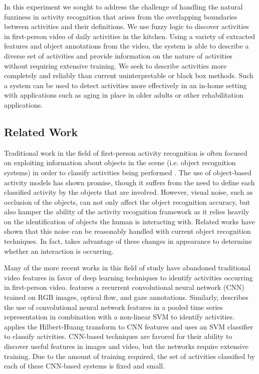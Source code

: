 \documentclass[12pt]{report}
\begin{document}
In this experiment we sought to address the challenge of handling the natural fuzziness in activity recognition that arises from the overlapping boundaries between activities and their definitions. We use fuzzy logic to discover activities in first-person video of daily activities in the kitchen. Using a variety of extracted features and object annotations from the video, the system is able to describe a diverse set of activities and provide information on the nature of activities without requiring extensive training. We seek to describe activities more completely and reliably than current uninterpretable or black box methods. Such a system can be used to detect activities more effectively in an in-home setting with applications such as aging in place in older adults or other rehabilitation applications.

\subsection{Related Work}
Traditional work in the field of first-person activity recognition is often focused on exploiting information about objects in the scene (i.e. object recognition systems) in order to classify activities being performed \cite{Nakatani2019, McCandless2013, Pirsiavash2012, Sudhakaran2018, Wang2018}. The use of object-based activity models has shown promise, though it suffers from the need to define each classified activity by the objects that are involved. However, visual noise, such as occlusion of the objects, can not only affect the object recognition accuracy, but also hamper the ability of the activity recognition framework as it relies heavily on the identification of objects the human is interacting with. Related works have shown that this noise can be reasonably handled with current object recognition techniques. In fact, \cite{Pirsiavash2012} takes advantage of these changes in appearance to determine whether an interaction is occurring.

Many of the more recent works in this field of study have abandoned traditional video features in favor of deep learning techniques to identify activities occurring in first-person video.   \cite{Li} features a recurrent convolutional neural network (CNN) trained on RGB images, optical flow, and gaze annotations. Similarly, \cite{Ryoo2015} describes the use of convolutional neural network features in a pooled time series representation in combination with a non-linear SVM to identify activities. \cite{Purwanto2017} applies the Hilbert-Huang transform to CNN features and uses an SVM classifier to classify activities. CNN-based techniques are favored for their ability to discover useful features in images and video, but the networks require extensive training. Due to the amount of training required, the set of activities classified by each of these CNN-based systems is fixed and small.
\end{document}
